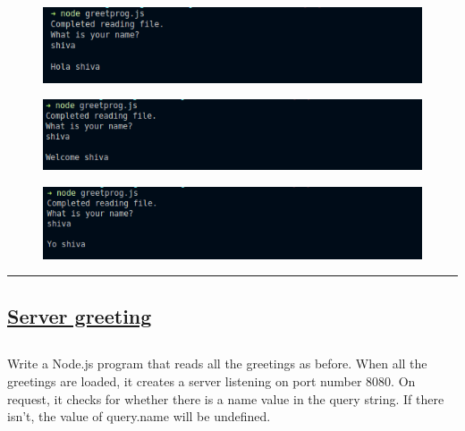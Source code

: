 \documentclass[12pt,letterpaper]{article}
\begin{document}
\newpage
\subsection*{}
\begin{figure}[h]
    \centering
    \includegraphics[width = \textwidth]{Non-block/op1.png}
\end{figure}
\begin{figure}[h]
    \centering
    \includegraphics[width = \textwidth]{Non-block/op2.png}
\end{figure}
\begin{figure}[h]
    \centering
    \includegraphics[width = \textwidth]{Non-block/op3.png}
\end{figure}


\hrule
\newpage

\subsection*{\underline{\textbf{Server greeting}}}
\subsection*{}
\begin{flushleft}
    Write a Node.js program that reads all the greetings as before. When all the greetings are loaded, it creates 
    a server listening on port number 8080. On request,  it  checks  for  whether  there  is  a name value  in  the  
    query string. If there isn’t, the value of query.name will be undefined.
\end{flushleft}
\end{document}
